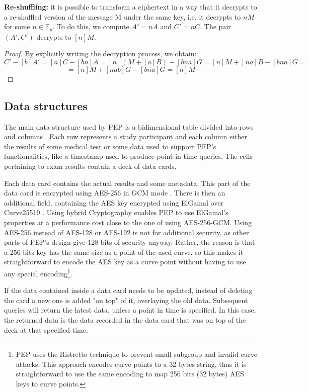 \documentclass{report}
\begin{document}
\textbf{Re-shuffling:} it is possible to transform a ciphertext in a way that it decrypts to a re-shuffled version of the message M under the same key, i.e. it decrypts to $nM$ for
some $n \in \mathds{F}_p$. To do this, we compute $A'=nA$ and $C'=nC$. The pair $(A', C')$ decrypts to $[n]M$. \newline
\begin{proof}
		By explicitly writing the decryption process, we obtain:
		$$C'-[b]A'=[n]C-[bn]A=[n](M+[a]B)-[bna]G=[n]M+[na]B-[bna]G=$$
		$$=[n]M+[nab]G-[bna]G=[n]M$$
\end{proof}

\subsection{Data structures}
The main data structure used by PEP is a bidimensional table divided into rows and columns \cite{pep-blueprint}. Each row represents a study participant and each column either the 
results of some medical test or some data used to support PEP's functionalities, like a timestamp used to produce point-in-time queries. The cells pertaining to exam results contain a deck of data cards. \par
Each data card contains the actual results and some metadata. This part of the data card is encrypted using AES-256 \cite{AES-standard} in GCM mode \cite{GCM}. There is then an 
additional field, containing the AES key encrypted using ElGamal over Curve25519 \cite{elliptic-elgamal}. Using hybrid Cryptography enables PEP to use ElGamal's properties at a 
performance cost close to the one of using AES-256-GCM. Using AES-256 instead of AES-128 or AES-192 is not for additional security, as other parts of PEP's design give 128 bits of
security anyway. Rather, the reason is that a 256 bits key has the same size as a point of the used curve, so this makes it straightforward to encode the AES key as a curve point
without having to use any special encoding\footnote{PEP uses the Ristretto technique\cite{ristretto-website} to prevent small subgroup and invalid curve attacks. This approach
encodes curve points to a 32-bytes string, thus it is straightforward to use the same encoding to map 256 bits (32 bytes) AES keys to curve points.}. \par
If the data contained inside a data card needs to be updated, instead of deleting the card a new one is added "on top" of it, overlaying the old data. Subsequent queries will
return the latest data, unless a point in time is specified. In this case, the returned data is the data recorded in the data card that was on top of the deck at that specified
time.
\end{document}
